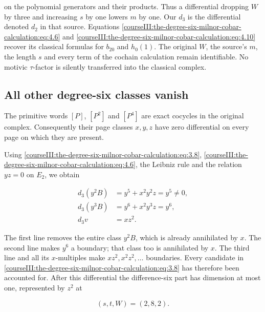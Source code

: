 on the polynomial generators and their products. Thus a differential dropping \(W\) by three and increasing \(s\) by one lowers \(m\) by one. Our \(d_3\) is the differential denoted \(d_2\) in that source. Equations \eqref{courseIII:the-degree-six-milnor-cobar-calculation:eq:4.6} and \eqref{courseIII:the-degree-six-milnor-cobar-calculation:eq:4.10} recover its classical formulas for \(b_{20}\) and \(h_0(1)\). The original \(W\), the source's \(m\), the length \(s\) and every term of the cochain calculation remain identifiable. No motivic \(\tau\)-factor is silently transferred into the classical complex.

\label{courseIII:the-degree-six-milnor-cobar-calculation:six-cobar-survival}

\subsection{All other degree-six classes vanish}
\label{courseIII:the-degree-six-milnor-cobar-calculation:section-5}

The primitive words \([P]\), \([P^2]\) and \([P^4]\) are exact cocycles in the original complex. Consequently their page classes \(x,y,z\) have zero differential on every page on which they are present.

Using \eqref{courseIII:the-degree-six-milnor-cobar-calculation:eq:3.8}, \eqref{courseIII:the-degree-six-milnor-cobar-calculation:eq:4.6}, the Leibniz rule and the relation \(yz=0\) on \(E_2\), we obtain

\begin{equation}
\begin{aligned}
 d_3(y^2B)&=y^5+x^2y^2z=y^5\ne0,\\
 d_3(y^3B)&=y^6+x^2y^3z=y^6,\\
 d_3v&=xz^2.
\end{aligned}
\label{courseIII:the-degree-six-milnor-cobar-calculation:eq:5.1}
\end{equation}

The first line removes the entire class \(y^2B\), which is already annihilated by \(x\). The second line makes \(y^6\) a boundary; that class too is annihilated by \(x\). The third line and all its \(x\)-multiples make \(xz^2,x^2z^2,\ldots\) boundaries. Every candidate in \eqref{courseIII:the-degree-six-milnor-cobar-calculation:eq:3.8} has therefore been accounted for. After this differential the difference-six part has dimension at most one, represented by \(z^2\) at

\begin{equation}
(s,t,W)=(2,8,2).
 \label{courseIII:the-degree-six-milnor-cobar-calculation:eq:5.2}
\end{equation}

